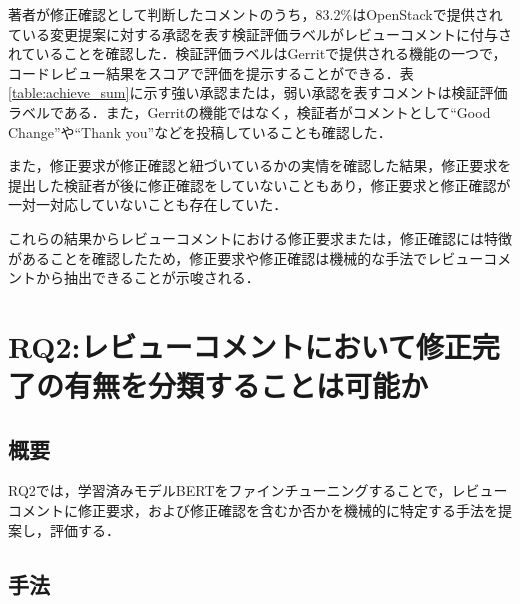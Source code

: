 \documentclass[T,J]{fose} %
\newcommand{\RQTwo}{レビューコメントにおいて修正完了の有無を分類することは可能か}
\newcommand{\change}[1]{\colorbox{green}{{\bf CHANGE}:}{\color{blue} {\textbf{[#1]}}}}
\begin{document}

著者が修正確認として判断したコメントのうち，83.2\%はOpenStackで提供されている変更提案に対する承認を表す検証評価ラベルがレビューコメントに付与されていることを確認した．検証評価ラベルはGerritで提供される機能の一つで，コードレビュー結果をスコアで評価を提示することができる．表\ref{table:achieve_sum}に示す強い承認または，弱い承認を表すコメントは検証評価ラベルである．また，Gerritの機能ではなく，検証者がコメントとして``Good Change''や``Thank you''などを投稿していることも確認した．

また，修正要求が修正確認と紐づいているかの実情を確認した結果，修正要求を提出した検証者が後に修正確認をしていないこともあり，修正要求と修正確認が一対一対応していないことも存在していた．


これらの結果からレビューコメントにおける修正要求または，修正確認には特徴があることを確認したため，修正要求や修正確認は機械的な手法でレビューコメントから抽出できることが示唆される．

\section{RQ2:\RQTwo}\label{sec:RQ2}

\subsection{概要}
RQ2では，学習済みモデルBERTをファインチューニングすることで，レビューコメントに修正要求，および修正確認を含むか否かを機械的に特定する手法を提案し，評価する．


\subsection{手法}
\end{document}
